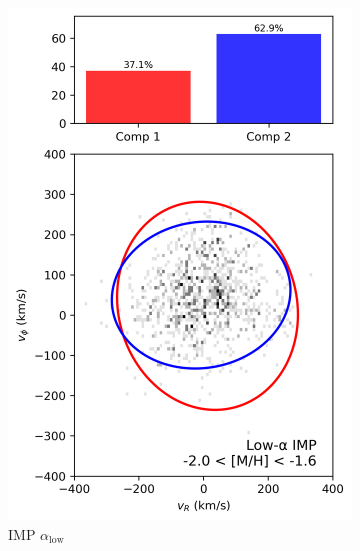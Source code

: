 \documentclass[a4paper,10pt]{article}
\begin{document}
\begin{multicols}{2}
\begin{figure}[H]
\begin{subfigure}[t]{0.24\linewidth}
    \includegraphics[width=\linewidth]{../figures/gmm_imp_low_alpha_k2.png}
    \caption{IMP $\alpha_{\mathrm{low}}$}
  \end{subfigure}
  \hfill
  \begin{subfigure}[t]{0.24\linewidth}

\end{subfigure}
\end{figure}
\end{multicols}
\end{document}
